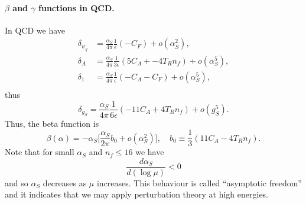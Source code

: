 \paragraph{$\beta$ and $\gamma$ functions in QCD.} In QCD we have
\begin{align}
    \delta_{\psi_q} &= \frac{\alpha_S}{4\pi}\frac{1}{\epsilon}(-C_F) + o(\alpha_S^2), \\
    \delta_A &= \frac{\alpha_S}{4\pi}\frac{1}{3\epsilon}(5C_A + -4T_Rn_f) + o(\alpha_S^5), \\
    \delta_1 &= \frac{\alpha_S}{4\pi}\frac{1}{\epsilon}(-C_A - C_F) + o(\alpha_S^5), \\
\end{align}
thus 
\begin{equation}
    \delta_{g_S} = \frac{\alpha_S}{4\pi}\frac{1}{6\epsilon}(-11 C_A + 4T_Rn_f) + o(g_S^5).
\end{equation}
Thus, the beta function is
\begin{equation}
    \beta(\alpha) = -\alpha_S\bigg[\frac{\alpha_S}{2\pi}b_0 + o(\alpha_S^2)\bigg],\quad b_0 \equiv \frac{1}{3}(11C_A - 4T_Rn_f).
\end{equation}
Note that for small $\alpha_S$ and $n_f \le 16$ we have
\begin{equation}
    \frac{d\alpha_S}{d(\log{\mu})} < 0
\end{equation}
and so $\alpha_S$ decreases as $\mu$ increases. This behaviour is called ``asymptotic freedom'' and it indicates that we may apply perturbation theory at high energies. 


